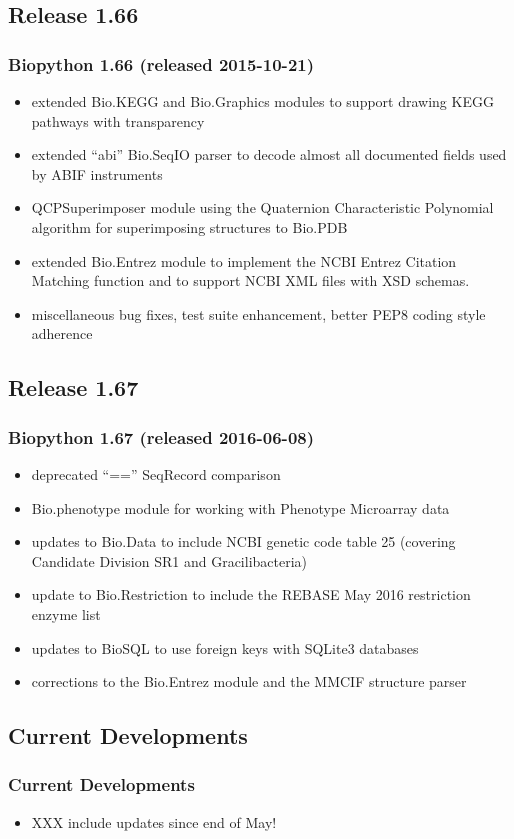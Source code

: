\documentclass[trans]{beamer}
\begin{document}
\subsection*{Release 1.66}
\frame
{
  \frametitle{Biopython 1.66 (released 2015-10-21)}

  \begin{itemize}
  \item extended Bio.KEGG and Bio.Graphics modules to support drawing KEGG pathways with transparency
  \item extended ``abi'' Bio.SeqIO parser to decode almost all documented fields used by ABIF instruments
  \item QCPSuperimposer module using the Quaternion Characteristic Polynomial algorithm for superimposing structures to Bio.PDB
  \item extended Bio.Entrez module to implement the NCBI Entrez Citation Matching function and to support NCBI XML files with XSD schemas.
  \item miscellaneous bug fixes, test suite enhancement, better PEP8 coding style adherence
  \end{itemize}
}
\subsection*{Release 1.67}
\frame
{
  \frametitle{Biopython 1.67 (released 2016-06-08)}

  \begin{itemize}
  \item deprecated ``=='' SeqRecord comparison
  \item Bio.phenotype module for working with Phenotype Microarray data
  \item updates to Bio.Data to include NCBI genetic code table 25 (covering Candidate Division SR1 and Gracilibacteria)
  \item update to Bio.Restriction to include the REBASE May 2016 restriction enzyme list
  \item updates to BioSQL to use foreign keys with SQLite3 databases
  \item corrections to the Bio.Entrez module and the MMCIF structure parser
  \end{itemize}
}
\subsection*{Current Developments}
\frame
{
  \frametitle{Current Developments}

  \begin{itemize}
  \item XXX include updates since end of May!
  \end{itemize}
}
\end{document}
